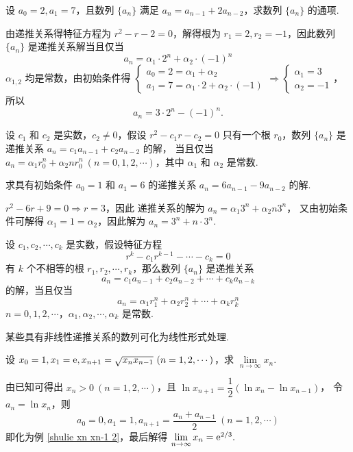 \begin{example}
    设 $a_0=2,a_1=7$，且数列 $\{a_n\}$ 满足 $a_n=a_{n-1}+2a_{n-2}$，求数列 $\{a_n\}$ 的通项.
\end{example}
\begin{solution}
    由递推关系得特征方程为 $r^2-r-2=0$，解得根为 $r_1=2,r_2=-1$，因此数列 $\{a_n\}$ 是递推关系解当且仅当
    $$a_n=\alpha_1\cdot 2^n+\alpha_2\cdot(-1)^n$$
    $\alpha_{1,2}$ 均是常数，由初始条件得 $\displaystyle\begin{cases}a_{0}=2=\alpha _{1}+\alpha _{2} \\
            a_{1}=7=\alpha _{1}\cdot 2+\alpha _{2}\cdot \left( -1\right)\end{cases}\Rightarrow\begin{cases}
            \alpha_1=3 \\ \alpha_2=-1
        \end{cases}$，所以 $$a_n=3\cdot 2^n-(-1)^n.$$
\end{solution}
\begin{theorem}
    设 $c_1$ 和 $c_2$ 是实数，$c_2\not=0$，假设 $r^2-c_1r-c_2=0$ 只有一个根 $r_0$，数列 $\{a_n\}$ 是递推关系 $a_n=c_1a_{n-1}+c_2a_{n-2}$ 的解，
    当且仅当 $a_n=\alpha_1r_0^n+\alpha_2nr_0^n~  (n=0,1,2,\cdots)$，其中 $\alpha_1$ 和 $\alpha_2$ 是常数.
\end{theorem}
\begin{example}
    求具有初始条件 $a_0=1$ 和 $a_1=6$ 的递推关系 $a_n=6a_{n-1}-9a_{n-2}$ 的解.
\end{example}
\begin{solution}
    $r^2-6r+9=0\Rightarrow r=3$，因此 递推关系的解为 $a_n=\alpha_1 3^n+\alpha_2 n3^n$，
    又由初始条件可解得 $\alpha_1=1=\alpha_2$，因此解为 $a_n=3^n+n\cdot 3^n.$
\end{solution}
\begin{theorem}
    设 $c_1,c_2,\cdots,c_k$ 是实数，假设特征方程 $$r^k-c_1r^{k-1}-\cdots-c_k=0$$
    有 $k$ 个不相等的根 $r_1,r_2,\cdots,r_k$，那么数列 $\{a_n\}$ 是递推关系
    $$a_n=c_1a_{n-1}+c_2a_{n-2}+\cdots+c_ka_{n-k}$$
    的解，当且仅当 $$a_{n}=\alpha _{1}r_{1}^{n}+\alpha _{2}r_{2}^{n}+\cdots +\alpha _{k}r_{k}^{n}$$
    $n=0,1,2,\cdots$，$\alpha_1,\alpha_2,\cdots,\alpha_k$ 是常数.
\end{theorem}

某些具有非线性递推关系的数列可化为线性形式处理.
\begin{example}
    设 $x_0=1,x_1=\mathrm{e} ,x_{n+1}=\sqrt{x_n x_{n-1}}~  (n=1,2,\cdots)$，求 $\lim\limits_{n\to\infty}x_n.$
\end{example}
\begin{solution}
    由已知可得出 $x_n>0~  (n=1,2,\cdots)$，且 $\ln x_{n+1}=\dfrac{1}{2}(\ln x_n-\ln x_{n-1})$，
    令 $a_n=\ln x_n$，则 $$a_0=0,a_1=1,a_{n+1}=\dfrac{a_n+a_{n-1}}{2}~  (n=1,2,\cdots)$$
    即化为例 \ref{shulie xn xn-1 2}，最后解得 $\lim\limits_{n\to\infty}x_n=\mathrm{e} ^{2/3}.$
\end{solution}

